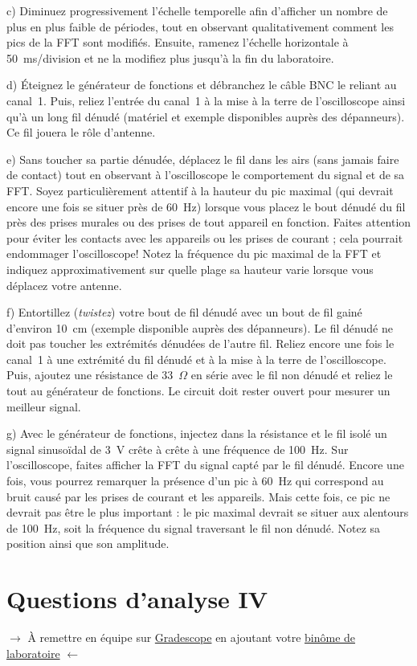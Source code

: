 \documentclass[canadien,12pt,oneside,letterpaper]{article}
\begin{document}
c) Diminuez progressivement l'échelle temporelle afin d'afficher un nombre de plus en plus faible de périodes, tout en observant qualitativement comment les pics de la FFT sont modifiés. Ensuite, ramenez l'échelle horizontale à 50~ms/division et ne la modifiez plus jusqu'à la fin du laboratoire.

d) Éteignez le générateur de fonctions et débranchez le câble BNC le reliant au canal~1. Puis, reliez l'entrée du canal~1 à la mise à la terre de l'oscilloscope ainsi qu'à un long fil dénudé (matériel et exemple disponibles auprès des dépanneurs). Ce fil jouera le rôle d'antenne.

e) Sans toucher sa partie dénudée, déplacez le fil dans les airs (sans jamais faire de contact) tout en observant à l'oscilloscope le comportement du signal et de sa FFT. Soyez particulièrement attentif à la hauteur du pic maximal (qui devrait encore une fois se situer près de 60~Hz) lorsque vous placez le bout dénudé du fil près des prises murales ou des prises de tout appareil en fonction. Faites attention pour éviter les contacts avec les appareils ou les prises de courant ; cela pourrait endommager l'oscilloscope! Notez la fréquence du pic maximal de la FFT et indiquez approximativement sur quelle plage sa hauteur varie lorsque vous déplacez votre antenne.

f) Entortillez (\textit{twistez}) votre bout de fil dénudé avec un bout de fil gainé d'environ 10~cm (exemple disponible auprès des dépanneurs). Le fil dénudé ne doit pas toucher les extrémités dénudées de l'autre fil. Reliez encore une fois le canal~1 à une extrémité du fil dénudé et à la mise à la terre de l'oscilloscope. Puis, ajoutez une résistance de 33~$\Omega$ en série avec le fil non dénudé et reliez le tout au générateur de fonctions. Le circuit doit rester ouvert pour mesurer un meilleur signal.

g) Avec le générateur de fonctions, injectez dans la résistance et le fil isolé un signal sinusoïdal de 3~V crête à crête à une fréquence de 100~Hz. Sur l'oscilloscope, faites afficher la FFT du signal capté par le fil dénudé. Encore une fois, vous pourrez remarquer la présence d'un pic à 60~Hz qui correspond au bruit causé par les prises de courant et les appareils. Mais cette fois, ce pic ne devrait pas être le plus important : le pic maximal devrait se situer aux alentours de 100~Hz, soit la fréquence du signal traversant le fil non dénudé. Notez sa position ainsi que son amplitude.


\section{Questions d'analyse IV} \label{sec:grade}
\vspace{-0.5cm}
\noindent$\rightarrow$ À remettre en équipe sur \href{https://www.gradescope.com/}{Gradescope} en ajoutant votre \href{https://help.gradescope.com/article/m5qz2xsnjy-student-add-group-members}{binôme de laboratoire} $\leftarrow$
\end{document}

